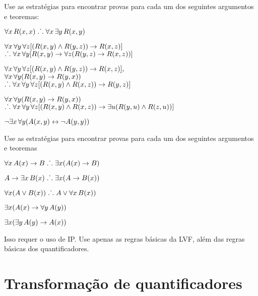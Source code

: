 \problempart
Use as estrat\'egias para encontrar provas para cada um dos  seguintes argumentos e teoremas:
\begin{earg}
\item $\forall x\,\mathord{R}(x,x) \mathrel{\ldotp\dot{}\,\ldotp} \forall x\,\exists y\,\mathord{R}(x,y)$
\item $\forall x\,\forall y\,\forall z[(\mathord{R}(x,y) \wedge \mathord{R}(y,z)) \rightarrow \mathord{R}(x,z)]$ \\
$\mathrel{\ldotp\dot{}\,\ldotp} \forall x\,\forall y[\mathord{R}(x,y) \rightarrow \forall z(\mathord{R}(y,z) \rightarrow \mathord{R}(x,z))]$
\item $\forall x\,\forall y\,\forall z[(\mathord{R}(x,y) \wedge \mathord{R}(y,z)) \rightarrow \mathord{R}(x,z)],$\\ $\forall x\,\forall y(\mathord{R}(x,y) \rightarrow \mathord{R}(y, x))$ \\ $\mathrel{\ldotp\dot{}\,\ldotp} \forall x\,\forall y\,\forall z[(\mathord{R}(x,y) \wedge \mathord{R}(x,z)) \rightarrow \mathord{R}(y,z)]$
\item $\forall x\,\forall y(\mathord{R}(x,y) \rightarrow \mathord{R}(y, x))$ \\$\mathrel{\ldotp\dot{}\,\ldotp} \forall x\,\forall y\,\forall z[(\mathord{R}(x,y) \wedge \mathord{R}(x,z)) \rightarrow \exists u(\mathord{R}(y,u) \wedge \mathord{R}(z,u))]$
\item $\neg \exists x\,\forall y (\mathord{A}(x, y) \leftrightarrow \lnot\mathord{A}(y, y))$
\end{earg}

\problempart
Use as estrat\'egias para encontrar provas para cada um dos  seguintes argumentos e teoremas
\begin{earg}
\item $\forall x\,\mathord{A}(x) \rightarrow B \mathrel{\ldotp\dot{}\,\ldotp} \exists x(\mathord{A}(x) \rightarrow B)$
\item $A \rightarrow \exists x\, \mathord{B}(x) \mathrel{\ldotp\dot{}\,\ldotp} \exists x(A \rightarrow \mathord{B}(x))$
\item $\forall x(A \vee \mathord{B}(x)) \mathrel{\ldotp\dot{}\,\ldotp} A \vee \forall x\,\mathord{B}(x))$
\item $\exists x(\mathord{A}(x) \rightarrow \forall y\,\mathord{A}(y))$
\item $\exists x(\exists y\,\mathord{A}(y) \rightarrow \mathord{A}(x))$
\end{earg}
Isso requer o uso de IP. Use apenas as regras b\'asicas da LVF, al\'em das regras b\'asicas dos quantificadores.


\chapter{Transforma\c c\~ao de quantificadores}\label{s:CQ}

